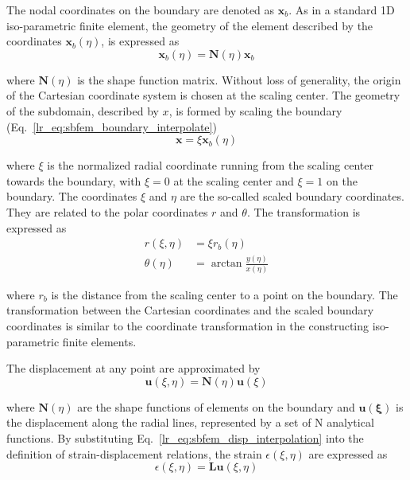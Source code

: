 The nodal coordinates on the boundary are denoted as $\mathbf{x}_b$. As in a standard 1D iso-parametric finite element, the geometry of the element described by the coordinates $\mathbf{x}_b(η)$, is expressed as
\begin{equation}
    \mathbf{x}_b(\eta) = \mathbf{N}(\eta) \mathbf{x}_b
    \label{lr_eq:sbfem_boundary_interpolate}
\end{equation}

where $\mathbf{N}(\eta)$ is the shape function matrix.
Without loss of generality, the origin of the Cartesian coordinate system is chosen at the scaling center.
The geometry of the subdomain, described by $x$, is formed by scaling the boundary (Eq.~\ref{lr_eq:sbfem_boundary_interpolate})
\begin{equation}
    \mathbf{x} = \xi \mathbf{x}_b (\eta)
\end{equation}

where $\xi$ is the normalized radial coordinate running from the scaling center towards the boundary, with $\xi=0$ at the scaling center and $\xi=1$ on the boundary.
The coordinates $\xi$ and $\eta$ are the so-called scaled boundary coordinates.
They are related to the polar coordinates $r$ and $\theta$.
The transformation is expressed as
\begin{equation}
\begin{aligned}
    r(\xi,\eta) &= \xi r_b(\eta)     \\
    \theta(\eta) &= \arctan \frac{y(\eta)}{x(\eta)}
\end{aligned}
\end{equation}

where $r_b$ is the distance from the scaling center to a point on the boundary.
The transformation between the Cartesian coordinates and the scaled boundary coordinates is similar to the coordinate transformation in the constructing iso-parametric finite elements.

The displacement at any point are approximated by
\begin{equation}
    \mathbf{u}(\xi,\eta) = \mathbf{N}(\eta) \mathbf{u}(\xi)
    \label{lr_eq:sbfem_disp_interpolation}
\end{equation}

where $\mathbf{N}(\eta)$ are the shape functions of elements on the boundary and $\mathbf{u(\xi)}$ is the displacement along the radial lines, represented by a set of N analytical functions.
By substituting Eq.~\ref{lr_eq:sbfem_disp_interpolation} into the definition of strain-displacement relations, the strain $\epsilon(\xi,\eta)$ are expressed as
\begin{equation}
    \epsilon(\xi,\eta) = \mathbf{Lu}(\xi,\eta)
    \label{lr_eq:sbfem_strain_disp_relation}
\end{equation}

